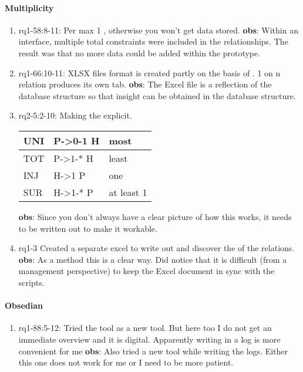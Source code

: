 \paragraph{Multiplicity}
\begin{enumerate}
    \item rq1-58:8-11: Per  max 1 , otherwise you won't get data stored.
    \newline\textbf{obs}: Within an interface, multiple total constraints were included in the relationships.
    The result was that no more data could be added within the prototype.

    \item rq1-66:10-11: XLSX files format is created partly on the basis of .
    1 on n relation produces its own tab.
    \newline\textbf{obs}: The Excel file is a reflection of the database structure so that insight can be obtained in the database structure.

    \item rq2-5:2-10: Making the  explicit.\newline
    \begin{tabular}{ || l | l | l ||}
    \hline
    UNI & P->0-1 H &  most\\  \hline    
    TOT & P->1-* H  & least\\  \hline
    INJ & H->1 P  &   one\\  \hline
    SUR & H->1-* P &  at least 1\\ \hline
    \end{tabular}
    \newline\textbf{obs}: Since you don't always have a clear picture of how this works, it needs to be written out to make it workable.
    
    \item rq1-3 Created a separate excel to write out and discover the  of the relations.
    \newline\textbf{obs}: As a method this is a clear way.
    Did notice that it is difficult (from a management perspective) to keep the Excel document in sync with the scripts.

\end{enumerate}

\paragraph{Obsedian}
\begin{enumerate}
    \item rq1-88:5-12: Tried the tool  as a new tool.
    But here too I do not get an immediate overview and it is digital.
    Apparently writing in a log is more convenient for me
    \newline\textbf{obs}: Also tried a new tool while writing the logs.
    Either this one does not work for me or I need to be more patient.

\end{enumerate}

